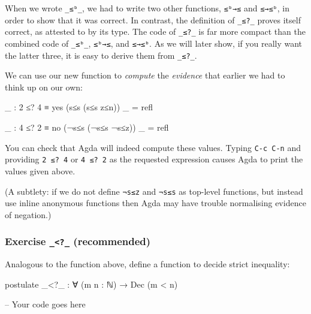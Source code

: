 When we wrote \texttt{\_≤ᵇ\_}, we had to write two other functions,
\texttt{≤ᵇ→≤} and \texttt{≤→≤ᵇ}, in order to show that it was correct.
In contrast, the definition of \texttt{\_≤?\_} proves itself correct, as
attested to by its type. The code of \texttt{\_≤?\_} is far more compact
than the combined code of \texttt{\_≤ᵇ\_}, \texttt{≤ᵇ→≤}, and
\texttt{≤→≤ᵇ}. As we will later show, if you really want the latter
three, it is easy to derive them from \texttt{\_≤?\_}.

We can use our new function to \emph{compute} the \emph{evidence} that
earlier we had to think up on our own:

\begin{fence}
\begin{code}
_ : 2 ≤? 4 ≡ yes (s≤s (s≤s z≤n))
_ = refl

_ : 4 ≤? 2 ≡ no (¬s≤s (¬s≤s ¬s≤z))
_ = refl
\end{code}
\end{fence}

You can check that Agda will indeed compute these values. Typing
\texttt{C-c\ C-n} and providing \texttt{2\ ≤?\ 4} or \texttt{4\ ≤?\ 2}
as the requested expression causes Agda to print the values given above.

(A subtlety: if we do not define \texttt{¬s≤z} and \texttt{¬s≤s} as
top-level functions, but instead use inline anonymous functions then
Agda may have trouble normalising evidence of negation.)

\hypertarget{exercise-__-recommended}{%
\subsubsection{\texorpdfstring{Exercise \texttt{\_\textless{}?\_}
(recommended)}{Exercise \_\textless?\_ (recommended)}}\label{exercise-__-recommended}}

Analogous to the function above, define a function to decide strict
inequality:

\begin{fence}
\begin{code}
postulate
  _<?_ : ∀ (m n : ℕ) → Dec (m < n)
\end{code}
\end{fence}

\begin{fence}
\begin{code}
-- Your code goes here
\end{code}
\end{fence}

